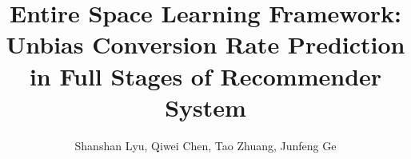 \documentclass[sigconf]{acmart}
\begin{document}
\title{Entire Space Learning Framework: Unbias Conversion Rate Prediction in Full Stages of Recommender System}


\iffalse
\author{Shanshan Lyu}
\email{lss271346@alibaba-inc.com}
\affiliation{%
\institution{Alibaba Group}
}
\author{Qiwei Chen}
\email{chenqiwei@alibaba-inc.com}
\affiliation{%
\institution{Alibaba Group}
}
\author{Tao Zhuang}
\email{zhuangtao.zt@alibaba-inc.com}
\affiliation{%
\institution{Alibaba Group}
}
\author{Junfeng Ge}
\email{beili.gjf@alibaba-inc.com}
\affiliation{%
\institution{Alibaba Group}
}
\fi

\author{Shanshan Lyu, Qiwei Chen, Tao Zhuang, Junfeng Ge}
\renewcommand{\shortauthors}{Shanshan Lyu, et al.}


\end{document}

